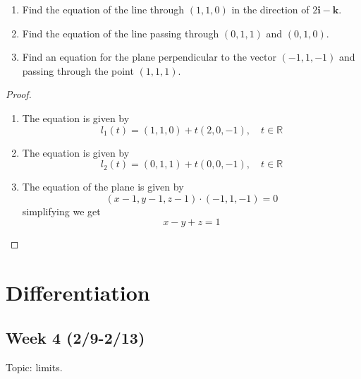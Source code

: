 \documentclass[openany]{book}
\newcommand{\R}{\mathbb{R}}
\begin{document}
 \begin{prob}
    \begin{enumerate}
        \item[(a)] Find the equation of the line through \( (1, 1, 0) \) in the direction of \( 2\mathbf{i} - \mathbf{k} \).  
        \item[(b)] Find the equation of the line passing through \( (0, 1, 1) \) and \( (0, 1, 0) \).  
        \item[(c)] Find an equation for the plane perpendicular to the vector \( (-1, 1, -1) \) and passing through the point \( (1, 1, 1) \).
    \end{enumerate}
\end{prob}
\begin{proof}
    \begin{enumerate}
        \item[(a)] The equation is given by 
        \begin{equation*}
            l_1(t)=(1,1,0)+t(2, 0, -1), \quad t\in\R
        \end{equation*}
        \item[(b)] The equation is given by 
        \begin{equation*}
            l_2(t)=(0,1,1)+t(0, 0, -1), \quad t\in\R
        \end{equation*}
        \item[(c)] The equation of the plane is given by 
        \begin{equation*}
            (x-1, y-1, z-1)\cdot (-1, 1, -1)=0
        \end{equation*}
        simplifying we get 
        \begin{equation*}
            x-y+z=1
        \end{equation*}
    \end{enumerate}
\end{proof}


\chapter{Differentiation}

\section*{\centering Week 4 (2/9-2/13)}
Topic: limits.
\end{document}

